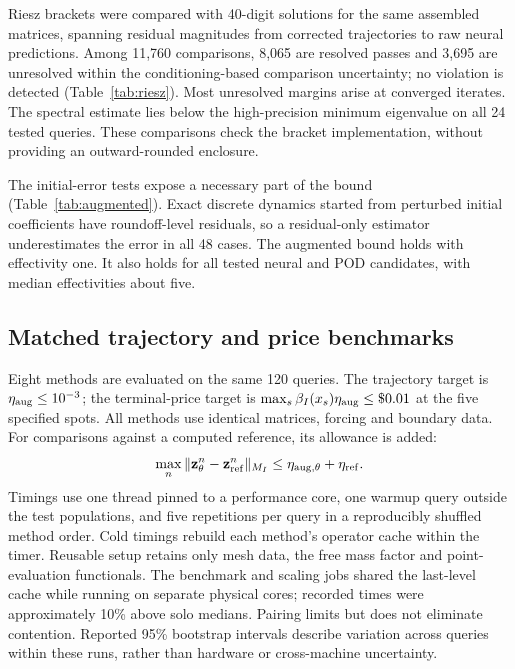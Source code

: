 \documentclass[11pt]{amsart}
\theoremstyle{remark}
\newcommand{\zz}{\mathbf z}
\begin{document}


Riesz brackets were compared with 40-digit solutions for the same assembled
matrices, spanning residual magnitudes from corrected trajectories to raw
neural predictions. Among 11,760 comparisons, 8,065 are resolved passes
and 3,695 are unresolved within the conditioning-based comparison
uncertainty; no violation is detected (Table~\ref{tab:riesz}). Most
unresolved margins arise at converged iterates. The spectral estimate lies
below the high-precision minimum eigenvalue on all 24 tested queries.
These comparisons check the bracket implementation, without providing an
outward-rounded enclosure.



The initial-error tests expose a necessary part of the bound
(Table~\ref{tab:augmented}). Exact discrete dynamics started from perturbed
initial coefficients have roundoff-level residuals, so a residual-only
estimator underestimates the error in all 48 cases. The augmented bound
holds with effectivity one. It also holds for all tested neural and POD
candidates, with median effectivities about five.



\subsection{Matched trajectory and price benchmarks}
\label{ssec:benchmark}
Eight methods are evaluated on the same 120 queries. The trajectory target
is $\eta_{\rm aug}\le10^{-3}$; the terminal-price target is
$\max_s\beta_I(x_s)\eta_{\rm aug}\le\$0.01$ at the five specified spots.
All methods use identical matrices, forcing and boundary data.
For comparisons against a computed reference, its allowance is added:
\begin{equation}
 \max_n\|\zz_\theta^n-\zz_{\rm ref}^n\|_{M_I}
 \le\eta_{{\rm aug},\theta}+\eta_{\rm ref}.
 \label{eq:reference-solve-allowance}
\end{equation}
Timings use one thread pinned to a performance core, one warmup query
outside the test populations, and five repetitions per query in a
reproducibly shuffled method order. Cold timings rebuild each method's
operator cache within the timer. Reusable setup retains only mesh data,
the free mass factor and point-evaluation functionals.
The benchmark and scaling jobs shared the last-level cache while running
on separate physical cores; recorded times were approximately 10\% above
solo medians. Pairing limits but does not eliminate contention. Reported
95\% bootstrap intervals describe variation across queries within these
runs, rather than hardware or cross-machine uncertainty.
\end{document}
